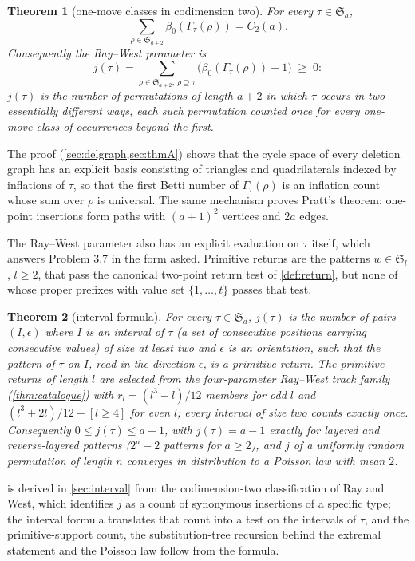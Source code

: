 \documentclass[11pt,reqno]{amsart}
\theoremstyle{plain}
\newtheorem{theorem}{Theorem}[section]
\theoremstyle{definition}
\theoremstyle{remark}
\newcommand{\Sym}{\mathfrak{S}}
\newcommand{\Gam}{\Gamma}
\newcommand{\bz}{\beta_0}
\begin{document}
\begin{theorem}[one-move classes in codimension two]\label{thm:B-intro}
For every $\tau\in\Sym_a$,
\[
\sum_{\rho\in\Sym_{a+2}}\bz(\Gam_\tau(\rho))=C_2(a).
\]
Consequently the Ray--West parameter is
\begin{equation}\label{eq:jB}
j(\tau)=\sum_{\rho\in\Sym_{a+2},\ \rho\supseteq\tau}\bigl(\bz(\Gam_\tau(\rho))-1\bigr)\;\ge\;0:
\end{equation}
$j(\tau)$ is the number of permutations of length $a+2$ in which $\tau$ occurs in two essentially different ways, each such permutation counted once for every one-move class of occurrences beyond the first.
\end{theorem}

The proof (\cref{sec:delgraph,sec:thmA}) shows that the cycle space of every deletion graph has an explicit basis consisting of triangles and quadrilaterals indexed by inflations of $\tau$, so that the first Betti number of $\Gam_\tau(\rho)$ is an inflation count whose sum over $\rho$ is universal. The same mechanism proves Pratt's theorem: one-point insertions form paths with $(a+1)^2$ vertices and $2a$ edges.

The Ray--West parameter also has an explicit evaluation on $\tau$ itself, which answers Problem 3.7 in the form asked. Primitive returns are the patterns $w\in\Sym_l$, $l\ge2$, that pass the canonical two-point return test of \cref{def:return}, but none of whose proper prefixes with value set $\{1,\dots,t\}$ passes that test.

\begin{theorem}[interval formula]\label{thm:F-intro}
For every $\tau\in\Sym_a$, $j(\tau)$ is the number of pairs $(I,\epsilon)$ where $I$ is an interval of $\tau$ (a set of consecutive positions carrying consecutive values) of size at least two and $\epsilon$ is an orientation, such that the pattern of $\tau$ on $I$, read in the direction $\epsilon$, is a primitive return. The primitive returns of length $l$ are selected from the four-parameter Ray--West track family (\cref{thm:catalogue}) with $r_l=(l^3-l)/12$ members for odd $l$ and $(l^3+2l)/12-[l\ge4]$ for even $l$; every interval of size two counts exactly once. Consequently $0\le j(\tau)\le a-1$, with $j(\tau)=a-1$ exactly for layered and reverse-layered patterns ($2^a-2$ patterns for $a\ge2$), and $j$ of a uniformly random permutation of length $n$ converges in distribution to a Poisson law with mean $2$.
\end{theorem}

 is derived in \cref{sec:interval} from the codimension-two classification of Ray and West, which identifies $j$ as a count of synonymous insertions of a specific type; the interval formula translates that count into a test on the intervals of $\tau$, and the primitive-support count, the substitution-tree recursion behind the extremal statement and the Poisson law follow from the formula.
\end{document}
